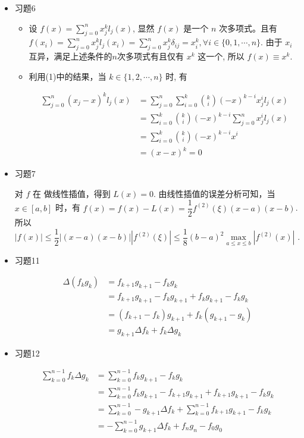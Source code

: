 \documentclass{article}
\begin{document}
\begin{spacing}{1.5}
\begin{itemize}
    \item [4.] 习题6
    
    \begin{itemize}
        \item [(1)] 设 $f(x) = \sum_{j=0}^{n} x_j^k l_j(x)$, 显然 $f(x)$ 是一个 $n$ 次多项式。且有 $f(x_i) = \sum_{j=0}^n x_{j}^{k} l_j(x_i) = \sum_{j=0}^n x_j^k \delta_{ij} = x_i^k, \forall i\in\{0,1,\cdots, n\}$. 由于 $x_i$ 互异，满足上述条件的$n$次多项式有且仅有 $x^k$ 这一个, 所以 $f(x)\equiv x^k$.
        \item [(2)] 利用(1)中的结果，当 $k\in\{1,2,\cdots,n\}$ 时, 有 
        
        $$\begin{array}{ll}
        \sum\limits_{j=0}^n (x_j - x)^k l_j(x) &= \sum\limits_{j=0}^n \sum\limits_{i=0}^k \binom{k}{i} (-x)^{k-i} x_j^i l_j(x) \\&= \sum\limits_{i=0}^k \binom{k}{i}(-x)^{k-i}\sum\limits_{j=0}^n x_j^il_j(x)\\&= \sum\limits_{i=0}^k \binom{k}{i}(-x)^{k-i} x^i \\ &= (x - x)^k = 0
        \end{array}$$

    \end{itemize}

    \item [5.] 习题7
    
    对 $f$ 在 做线性插值，得到 $L(x) = 0$. 由线性插值的误差分析可知，当 $x\in[a,b]$ 时，有 $f(x) = f(x) - L(x) = \dfrac{1}{2}f^{(2)}(\xi )(x-a)(x-b)$. 所以 $|f(x)|\leq \dfrac{1}{2}|(x-a)(x-b)| |f^{(2)}(\xi)| \leq \dfrac{1}{8}(b-a)^2\max\limits_{a\leq x \leq b} |f^{(2)}(x)|$ .

    \item [6.] 习题11 
    
    $$\begin{array}{ll}
        \Delta(f_kg_k) &= f_{k+1}g_{k+1} - f_kg_k \\&= f_{k+1}g_{k+1} - f_kg_{k+1} + f_{k}g_{k+1} - f_kg_k\\&=(f_{k+1} - f_k)g_{k+1} + f_k(g_{k+1} - g_k) \\&= g_{k+1}\Delta f_k + f_k\Delta g_{k}
    \end{array}$$

    \item [7.] 习题12
    
    $$\begin{array}{ll}
    \sum\limits_{k=0}^{n-1} f_k\Delta g_k &= \sum\limits_{k=0}^{n-1} f_kg_{k+1} - f_kg_k\\&= \sum\limits_{k=0}^{n-1} f_kg_{k+1} - f_{k+1}g_{k+1} + f_{k+1}g_{k+1} - f_kg_k \\&= \sum\limits_{k=0}^{n-1} -g_{k+1}\Delta f_k + \sum\limits_{k=0}^{n-1} f_{k+1}g_{k+1} - f_kg_k\\ &= -\sum\limits_{k=0}^{n-1} g_{k+1}\Delta f_k + f_ng_n - f_0g_0
    \end{array}$$


\end{itemize}
\end{spacing}
\end{document}
